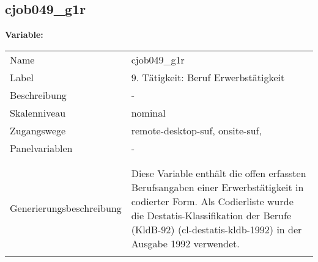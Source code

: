 	
	
	\subsection{cjob049\_g1r}
	\label{subSection:cjob049_g1r}

	\noindent\textbf{Variable:}\\
		\begin{tabular}{lL{11.3cm}}
			\label{tableVariable:cjob049_g1r}
			Name & cjob049\_g1r \\
			Label & 9. Tätigkeit: Beruf Erwerbstätigkeit \\
			Beschreibung & - \\
			Skalenniveau & nominal \\
			Zugangswege &
				remote-desktop-suf,
				onsite-suf,
 \\
			Panelvariablen & -
			 \\
			 \\
 \\
					Generierungsbeschreibung & Diese Variable enthält die offen erfassten Berufsangaben einer Erwerbstätigkeit in codierter Form. Als Codierliste wurde die Destatis-Klassifikation der Berufe (KldB-92) (cl-destatis-kldb-1992) in der Ausgabe 1992 verwendet. 
				 \\	
			 \\
		\end{tabular}






